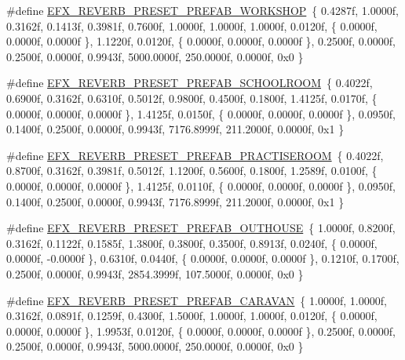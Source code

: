 \begin{DoxyCompactItemize}
\item 
\#define \hyperlink{efx-presets_8h_a6ad70d927e2b4e20cb27fa09c97f1757}{E\+F\+X\+\_\+\+R\+E\+V\+E\+R\+B\+\_\+\+P\+R\+E\+S\+E\+T\+\_\+\+P\+R\+E\+F\+A\+B\+\_\+\+W\+O\+R\+K\+S\+H\+OP}~\{ 0.\+4287f, 1.\+0000f, 0.\+3162f, 0.\+1413f, 0.\+3981f, 0.\+7600f, 1.\+0000f, 1.\+0000f, 1.\+0000f, 0.\+0120f, \{ 0.\+0000f, 0.\+0000f, 0.\+0000f \}, 1.\+1220f, 0.\+0120f, \{ 0.\+0000f, 0.\+0000f, 0.\+0000f \}, 0.\+2500f, 0.\+0000f, 0.\+2500f, 0.\+0000f, 0.\+9943f, 5000.\+0000f, 250.\+0000f, 0.\+0000f, 0x0 \}
\item 
\#define \hyperlink{efx-presets_8h_aec9b167a892e651662053f1a0c2ace4e}{E\+F\+X\+\_\+\+R\+E\+V\+E\+R\+B\+\_\+\+P\+R\+E\+S\+E\+T\+\_\+\+P\+R\+E\+F\+A\+B\+\_\+\+S\+C\+H\+O\+O\+L\+R\+O\+OM}~\{ 0.\+4022f, 0.\+6900f, 0.\+3162f, 0.\+6310f, 0.\+5012f, 0.\+9800f, 0.\+4500f, 0.\+1800f, 1.\+4125f, 0.\+0170f, \{ 0.\+0000f, 0.\+0000f, 0.\+0000f \}, 1.\+4125f, 0.\+0150f, \{ 0.\+0000f, 0.\+0000f, 0.\+0000f \}, 0.\+0950f, 0.\+1400f, 0.\+2500f, 0.\+0000f, 0.\+9943f, 7176.\+8999f, 211.\+2000f, 0.\+0000f, 0x1 \}
\item 
\#define \hyperlink{efx-presets_8h_ac5e6666e90ef33af0813c7f2ea1985e8}{E\+F\+X\+\_\+\+R\+E\+V\+E\+R\+B\+\_\+\+P\+R\+E\+S\+E\+T\+\_\+\+P\+R\+E\+F\+A\+B\+\_\+\+P\+R\+A\+C\+T\+I\+S\+E\+R\+O\+OM}~\{ 0.\+4022f, 0.\+8700f, 0.\+3162f, 0.\+3981f, 0.\+5012f, 1.\+1200f, 0.\+5600f, 0.\+1800f, 1.\+2589f, 0.\+0100f, \{ 0.\+0000f, 0.\+0000f, 0.\+0000f \}, 1.\+4125f, 0.\+0110f, \{ 0.\+0000f, 0.\+0000f, 0.\+0000f \}, 0.\+0950f, 0.\+1400f, 0.\+2500f, 0.\+0000f, 0.\+9943f, 7176.\+8999f, 211.\+2000f, 0.\+0000f, 0x1 \}
\item 
\#define \hyperlink{efx-presets_8h_a59f30910713319c0ac2d17319269e986}{E\+F\+X\+\_\+\+R\+E\+V\+E\+R\+B\+\_\+\+P\+R\+E\+S\+E\+T\+\_\+\+P\+R\+E\+F\+A\+B\+\_\+\+O\+U\+T\+H\+O\+U\+SE}~\{ 1.\+0000f, 0.\+8200f, 0.\+3162f, 0.\+1122f, 0.\+1585f, 1.\+3800f, 0.\+3800f, 0.\+3500f, 0.\+8913f, 0.\+0240f, \{ 0.\+0000f, 0.\+0000f, -\/0.\+0000f \}, 0.\+6310f, 0.\+0440f, \{ 0.\+0000f, 0.\+0000f, 0.\+0000f \}, 0.\+1210f, 0.\+1700f, 0.\+2500f, 0.\+0000f, 0.\+9943f, 2854.\+3999f, 107.\+5000f, 0.\+0000f, 0x0 \}
\item 
\#define \hyperlink{efx-presets_8h_aefbedf6a5b1126fe8108bc169192c889}{E\+F\+X\+\_\+\+R\+E\+V\+E\+R\+B\+\_\+\+P\+R\+E\+S\+E\+T\+\_\+\+P\+R\+E\+F\+A\+B\+\_\+\+C\+A\+R\+A\+V\+AN}~\{ 1.\+0000f, 1.\+0000f, 0.\+3162f, 0.\+0891f, 0.\+1259f, 0.\+4300f, 1.\+5000f, 1.\+0000f, 1.\+0000f, 0.\+0120f, \{ 0.\+0000f, 0.\+0000f, 0.\+0000f \}, 1.\+9953f, 0.\+0120f, \{ 0.\+0000f, 0.\+0000f, 0.\+0000f \}, 0.\+2500f, 0.\+0000f, 0.\+2500f, 0.\+0000f, 0.\+9943f, 5000.\+0000f, 250.\+0000f, 0.\+0000f, 0x0 \}

\end{DoxyCompactItemize}
